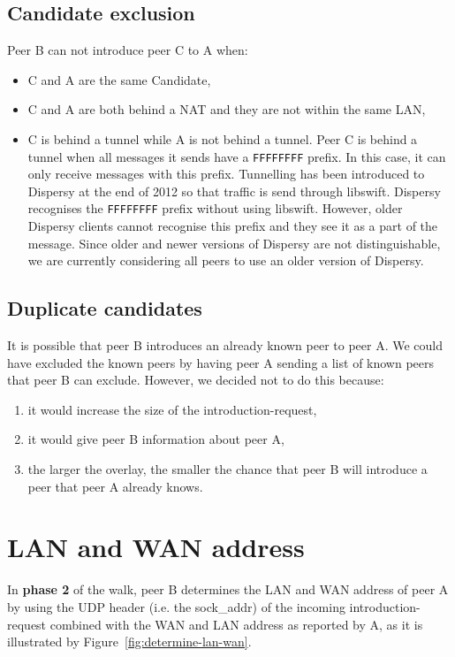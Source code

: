\subsection{Candidate exclusion}
\label{sec-4-1}
Peer B can not introduce peer C to A when:
\begin{itemize}
\item C and A are the same Candidate,
\item C and A are both behind a NAT and they are not within the same LAN,
\item C is behind a tunnel while A is not behind a tunnel.  Peer C is
behind a tunnel when all messages it sends have a \texttt{FFFFFFFF} prefix.
In this case, it can only receive messages with this prefix.
Tunnelling has been introduced to Dispersy at the end of 2012 so
that traffic is send through libswift.  Dispersy recognises the
\texttt{FFFFFFFF} prefix without using libswift.  However, older Dispersy
clients cannot recognise this prefix and they see it as a part of
the message.  Since older and newer versions of Dispersy are not
distinguishable, we are currently considering all peers to use an
older version of Dispersy.
\end{itemize}
\subsection{Duplicate candidates}
\label{sec-4-2}
It is possible that peer B introduces an already known peer to peer A.
We could have excluded the known peers by having peer A sending a list
of known peers that peer B can exclude.  However, we decided not to do
this because:
\begin{enumerate}
\item it would increase the size of the introduction-request,
\item it would give peer B information about peer A,
\item the larger the overlay, the smaller the chance that peer B will
introduce a peer that peer A already knows.
\end{enumerate}
\section{LAN and WAN address}
\label{sec-5}
In \textbf{phase 2} of the walk, peer B determines the LAN and WAN address of
peer A by using the UDP header (i.e. the sock\_addr) of the incoming
introduction-request combined with the WAN and LAN address as reported
by A, as it is illustrated by Figure~\ref{fig:determine-lan-wan}.

